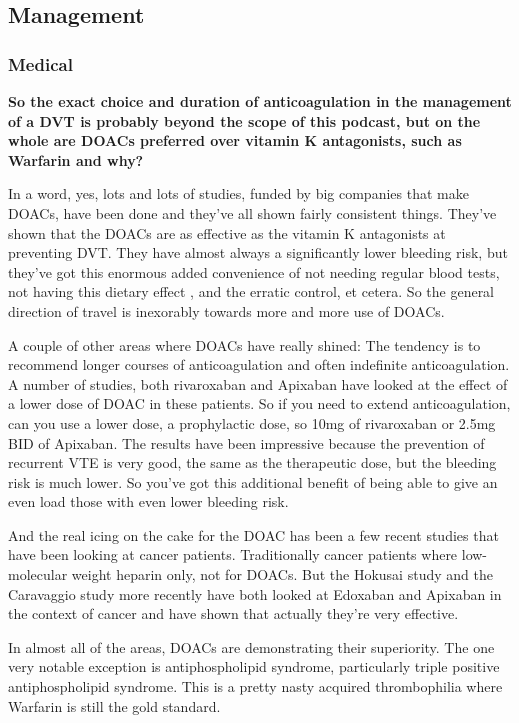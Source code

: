 \documentclass[
]{book}
\begin{document}
\hypertarget{management-30}{%
\subsection{Management}\label{management-30}}

\hypertarget{medical}{%
\subsubsection{Medical}\label{medical}}

\textbf{So the exact choice and duration of anticoagulation in the management
of a DVT is probably beyond the scope of this podcast, but on the whole
are DOACs preferred over vitamin K antagonists, such as Warfarin and
why?}

In a word, yes, lots and lots of studies, funded by big companies that
make DOACs, have been done and they've all shown fairly consistent
things. They've shown that the DOACs are as effective as the vitamin K
antagonists at preventing DVT. They have almost always a significantly
lower bleeding risk, but they've got this enormous added convenience of
not needing regular blood tests, not having this dietary effect , and
the erratic control, et cetera. So the general direction of travel is
inexorably towards more and more use of DOACs.

A couple of other areas where DOACs have really shined: The tendency is
to recommend longer courses of anticoagulation and often indefinite
anticoagulation. A number of studies, both rivaroxaban and Apixaban have
looked at the effect of a lower dose of DOAC in these patients. So if
you need to extend anticoagulation, can you use a lower dose, a
prophylactic dose, so 10mg of rivaroxaban or 2.5mg BID of Apixaban. The
results have been impressive because the prevention of recurrent VTE is
very good, the same as the therapeutic dose, but the bleeding risk is
much lower. So you've got this additional benefit of being able to give
an even load those with even lower bleeding risk.

And the real icing on the cake for the DOAC has been a few recent
studies that have been looking at cancer patients. Traditionally cancer
patients where low-molecular weight heparin only, not for DOACs. But the
Hokusai study\citep{raskob2018} and the Caravaggio study\citep{agnelli2020} more
recently have both looked at Edoxaban and Apixaban in the context of
cancer and have shown that actually they're very effective.

In almost all of the areas, DOACs are demonstrating their superiority.
The one very notable exception is antiphospholipid syndrome,
particularly triple positive antiphospholipid syndrome. This is a pretty
nasty acquired thrombophilia where Warfarin is still the gold
standard.\citep{pengo2018}
\end{document}
